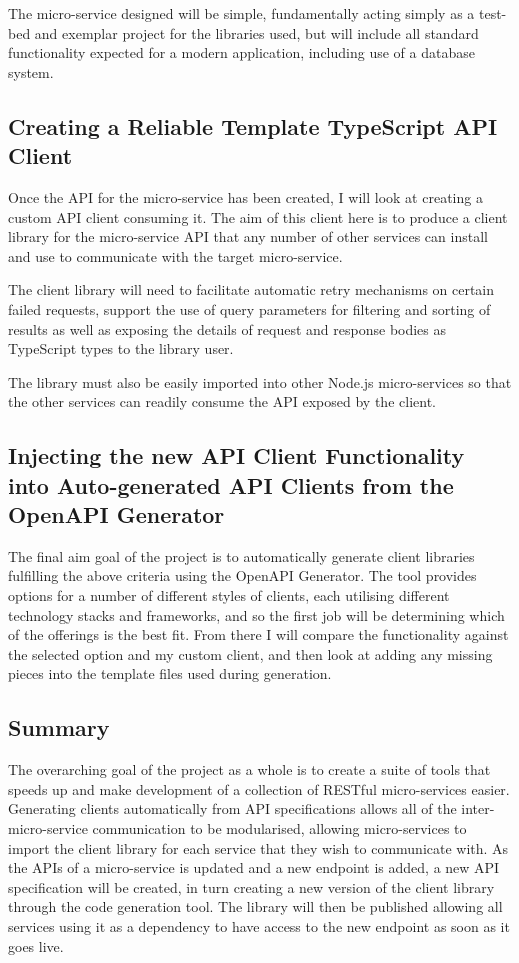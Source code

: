 The micro-service designed will be simple, fundamentally acting simply as a test-bed and exemplar project for the libraries used, but will include all standard functionality expected for a modern application, including use of a database system.

\subsection{Creating a Reliable Template TypeScript API Client }
Once the API for the micro-service has been created, I will look at creating a custom API client consuming it. The aim of this client here is to produce a client library for the micro-service API that any number of other services can install and use to communicate with the target micro-service.

The client library will need to facilitate automatic retry mechanisms on certain failed requests, support the use of query parameters for filtering and sorting of results as well as exposing the details of request and response bodies as TypeScript types to the library user.

The library must also be easily imported into other Node.js micro-services so that the other services can readily consume the API exposed by the client.

\subsection{Injecting the new API Client Functionality into Auto-generated API Clients from the OpenAPI Generator}
The final aim goal of the project is to automatically generate client libraries fulfilling the above criteria using the OpenAPI Generator. The tool provides options for a number of different styles of clients, each utilising different technology stacks and frameworks, and so the first job will be determining which of the offerings is the best fit. From there I will compare the functionality against the selected option and my custom client, and then look at adding any missing pieces into the template files used during generation.

\subsection{Summary}
The overarching goal of the project as a whole is to create a suite of tools that speeds up and make development of a collection of RESTful micro-services easier. Generating clients automatically from API specifications allows all of the inter-micro-service communication to be modularised, allowing micro-services to import the client library for each service that they wish to communicate with. As the APIs of a micro-service is updated and a new endpoint is added, a new API specification will be created, in turn creating a new version of the client library through the code generation tool. The library will then be published allowing all services using it as a dependency to have access to the new endpoint as soon as it goes live.

